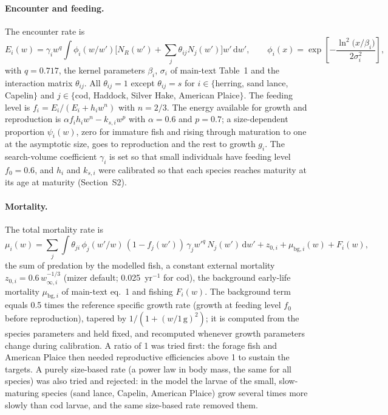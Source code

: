 \documentclass[11pt,letterpaper,fleqn]{article}
\newcommand{\yr}{yr$^{-1}$}
\begin{document}
\paragraph{Encounter and feeding.} The encounter rate is
\begin{equation}
E_i(w)=\gamma_i w^{q}\int \phi_i(w/w')\Big[N_R(w')+\sum_j \theta_{ij}N_j(w')\Big]w'\,\mathrm{d}w',\qquad
\phi_i(x)=\exp\!\left[-\frac{\ln^{2}\!\big(x/\beta_i\big)}{2\sigma_i^{2}}\right],
\end{equation}
with $q=0.717$, the kernel parameters $\beta_i$, $\sigma_i$ of main-text Table~1 and the interaction matrix $\theta_{ij}$. All $\theta_{ij}=1$ except $\theta_{ij}=s$ for $i\in\{$herring, sand lance, Capelin$\}$ and $j\in\{$cod, Haddock, Silver Hake, American Plaice$\}$. The feeding level is $f_i=E_i/(E_i+h_iw^{n})$ with $n=2/3$. The energy available for growth and reproduction is $\alpha f_i h_i w^{n}-k_{s,i}w^{p}$ with $\alpha=0.6$ and $p=0.7$; a size-dependent proportion $\psi_i(w)$, zero for immature fish and rising through maturation to one at the asymptotic size, goes to reproduction and the rest to growth $g_i$. The search-volume coefficient $\gamma_i$ is set so that small individuals have feeding level $f_0=0.6$, and $h_i$ and $k_{s,i}$ were calibrated so that each species reaches maturity at its age at maturity (Section~S2).

\paragraph{Mortality.} The total mortality rate is
\begin{equation}
\mu_i(w)=\sum_j\int \theta_{ji}\,\phi_j(w'/w)\,(1-f_j(w'))\,\gamma_j w'^{q}\,N_j(w')\,\mathrm{d}w' + z_{0,i}+\mu_{\mathrm{bg},i}(w)+F_i(w),
\end{equation}
the sum of predation by the modelled fish, a constant external mortality $z_{0,i}=0.6\,w_{\infty,i}^{-1/3}$ (mizer default; 0.025~\yr{} for cod), the background early-life mortality $\mu_{\mathrm{bg},i}$ of main-text eq.~1 and fishing $F_i(w)$. The background term equals 0.5 times the reference specific growth rate (growth at feeding level $f_0$ before reproduction), tapered by $1/(1+(w/1\,\mathrm{g})^{2})$; it is computed from the species parameters and held fixed, and recomputed whenever growth parameters change during calibration. A ratio of 1 was tried first: the forage fish and American Plaice then needed reproductive efficiencies above 1 to sustain the targets. A purely size-based rate (a power law in body mass, the same for all species) was also tried and rejected: in the model the larvae of the small, slow-maturing species (sand lance, Capelin, American Plaice) grow several times more slowly than cod larvae, and the same size-based rate removed them.
\end{document}

